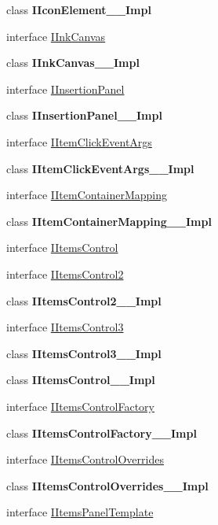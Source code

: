 \begin{DoxyCompactItemize}
\item 
class {\bfseries I\+Icon\+Element\+\_\+\+\_\+\+Impl}
\item 
interface \hyperlink{interface_windows_1_1_u_i_1_1_xaml_1_1_controls_1_1_i_ink_canvas}{I\+Ink\+Canvas}
\item 
class {\bfseries I\+Ink\+Canvas\+\_\+\+\_\+\+Impl}
\item 
interface \hyperlink{interface_windows_1_1_u_i_1_1_xaml_1_1_controls_1_1_i_insertion_panel}{I\+Insertion\+Panel}
\item 
class {\bfseries I\+Insertion\+Panel\+\_\+\+\_\+\+Impl}
\item 
interface \hyperlink{interface_windows_1_1_u_i_1_1_xaml_1_1_controls_1_1_i_item_click_event_args}{I\+Item\+Click\+Event\+Args}
\item 
class {\bfseries I\+Item\+Click\+Event\+Args\+\_\+\+\_\+\+Impl}
\item 
interface \hyperlink{interface_windows_1_1_u_i_1_1_xaml_1_1_controls_1_1_i_item_container_mapping}{I\+Item\+Container\+Mapping}
\item 
class {\bfseries I\+Item\+Container\+Mapping\+\_\+\+\_\+\+Impl}
\item 
interface \hyperlink{interface_windows_1_1_u_i_1_1_xaml_1_1_controls_1_1_i_items_control}{I\+Items\+Control}
\item 
interface \hyperlink{interface_windows_1_1_u_i_1_1_xaml_1_1_controls_1_1_i_items_control2}{I\+Items\+Control2}
\item 
class {\bfseries I\+Items\+Control2\+\_\+\+\_\+\+Impl}
\item 
interface \hyperlink{interface_windows_1_1_u_i_1_1_xaml_1_1_controls_1_1_i_items_control3}{I\+Items\+Control3}
\item 
class {\bfseries I\+Items\+Control3\+\_\+\+\_\+\+Impl}
\item 
class {\bfseries I\+Items\+Control\+\_\+\+\_\+\+Impl}
\item 
interface \hyperlink{interface_windows_1_1_u_i_1_1_xaml_1_1_controls_1_1_i_items_control_factory}{I\+Items\+Control\+Factory}
\item 
class {\bfseries I\+Items\+Control\+Factory\+\_\+\+\_\+\+Impl}
\item 
interface \hyperlink{interface_windows_1_1_u_i_1_1_xaml_1_1_controls_1_1_i_items_control_overrides}{I\+Items\+Control\+Overrides}
\item 
class {\bfseries I\+Items\+Control\+Overrides\+\_\+\+\_\+\+Impl}
\item 
interface \hyperlink{interface_windows_1_1_u_i_1_1_xaml_1_1_controls_1_1_i_items_panel_template}{I\+Items\+Panel\+Template}

\end{DoxyCompactItemize}
